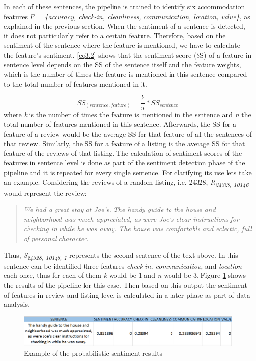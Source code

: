 In each of these sentences, the pipeline is trained to identify six accommodation features \textit{F = \{accuracy, check-in, cleanliness, communication, location, value\}}, as explained in the previous section. When the sentiment of a sentence is detected, it does not particularly refer to a certain feature. Therefore, based on the sentiment of the sentence where the feature is mentioned, we have to calculate the feature's sentiment.
\ref{eq3.2} shows that the sentiment score (SS) of a feature in sentence level depends on the SS of the sentence itself and the feature weights, which is the number of times the feature is mentioned in this sentence compared to the total number of features mentioned in it.
%

\begin{equation}
SS_{(sentence,feature)} = \frac{k}{n} * SS_{sentence}
\label{eq3.2}
\end{equation}
where \textit{k} is the number of times the feature is mentioned in the sentence and \textit{n} the total number of features mentioned in this sentence. Afterwards, the SS for a feature of a review would be the average SS for that feature of all the sentences of that review. Similarly, the SS for a feature of a listing is the average SS for that feature of the reviews of that listing.
The calculation of sentiment scores of the features in sentence level is done as part of the sentiment detection phase of the pipeline and it is repeated for every single sentence. For clarifying its use lets take an example. Considering the reviews of a random listing, i.e. 24328,  \textit{R\textsubscript{24328, 10146}} would represent the review:
\begin{quote}
\textit{We had a great stay at Joe's. The handy guide to the house and neighborhood was much appreciated, as were Joe's clear instructions for checking in while he was away. The house was comfortable and eclectic, full of personal character.}
\end{quote}
Thus, \textit{S\textsubscript{24328, 10146, 1}} represents the second sentence of the text above. In this sentence can be identified three features \textit{check-in, communication,} and \textit{location} each once, thus for each of them \textit{k} would be 1 and \textit{n} would be 3. Figure \ref{fig:sent} shows the results of the pipeline for this case. Then based on this output the sentiment of features in review and listing level is calculated in a later phase as part of data analysis.
\begin{figure}[h!]
	\centering
	\includegraphics[height=0.1\textheight]{example_pip}
	\caption{Example of the probabilistic sentiment results}
	\label{fig:sent}
\end{figure}
%
